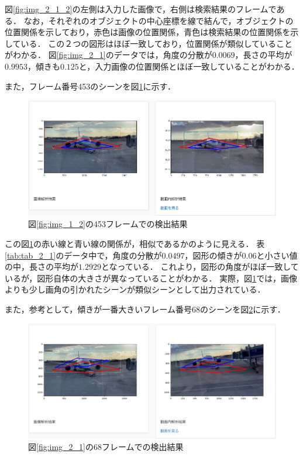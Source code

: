 \documentclass[a4j,12pt,dvipdfmx]{jreport}
\begin{document}
図\ref{fig:img_2_1_2}の左側は入力した画像で，右側は検索結果のフレームである．
なお，それぞれのオブジェクトの中心座標を線で結んで，オブジェクトの位置関係を示しており，赤色は画像の位置関係，青色は検索結果の位置関係を示している．
この２つの図形はほぼ一致しており，位置関係が類似していることがわかる．
図\ref{fig:img_2_1}のデータでは，角度の分散が$0.0069$，長さの平均が$0.9953$，傾きも$0.125$と，入力画像の位置関係とほぼ一致していることがわかる．

また，フレーム番号453のシーンを図\ref{fig:img_2_1_3}に示す．

\begin{figure}[H]
  \centering
  \includegraphics[width=13cm]{image/result_2_1_3.jpg}
  \caption{図\ref{fig:img_1_2}の453フレームでの検出結果}
  \label{fig:img_2_1_3}
\end{figure}

この図\ref{fig:img_2_1_3}の赤い線と青い線の関係が，相似であるかのように見える．
表\ref{tab:tab_2_1}のデータ中で，角度の分散が$0.0497$，図形の傾きが$0.06$と小さい値の中，長さの平均が$1.2929$となっている．
これより，図形の角度がほぼ一致しているが，図形自体の大きさが異なっていることがわかる．
実際，図\ref{fig:img_2_1_3}では，画像よりも少し画角の引かれたシーンが類似シーンとして出力されている．

また，参考として，傾きが一番大きいフレーム番号68のシーンを図\ref{fig:img_2_1_4}に示す．
\begin{figure}[b]
  \centering
  \includegraphics[width=13cm]{image/result_2_1_4.jpg}
  \caption{図\ref{fig:img_2_1}の68フレームでの検出結果}
  \label{fig:img_2_1_4}
\end{figure}
\end{document}
